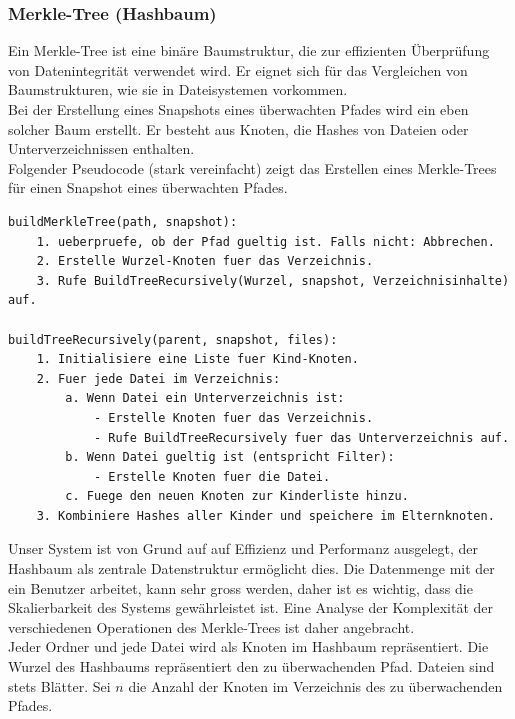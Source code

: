\documentclass[a4paper,12pt]{report}
\begin{document}
    \subsubsection{Merkle-Tree (Hashbaum)}
    Ein Merkle-Tree ist eine binäre Baumstruktur, die zur effizienten Überprüfung von Datenintegrität verwendet wird.
    Er eignet sich für das Vergleichen von Baumstrukturen, wie sie in Dateisystemen vorkommen.
    \\Bei der Erstellung eines Snapshots eines überwachten Pfades wird ein eben solcher Baum erstellt.
    Er besteht aus Knoten, die Hashes von Dateien oder Unterverzeichnissen enthalten.
    \\Folgender Pseudocode (stark vereinfacht) zeigt das Erstellen eines Merkle-Trees für einen Snapshot eines überwachten Pfades.

\begin{lstlisting}[language=Pseudo,label={lst:merkle-pseudo}]
buildMerkleTree(path, snapshot):
    1. ueberpruefe, ob der Pfad gueltig ist. Falls nicht: Abbrechen.
    2. Erstelle Wurzel-Knoten fuer das Verzeichnis.
    3. Rufe BuildTreeRecursively(Wurzel, snapshot, Verzeichnisinhalte) auf.

buildTreeRecursively(parent, snapshot, files):
    1. Initialisiere eine Liste fuer Kind-Knoten.
    2. Fuer jede Datei im Verzeichnis:
        a. Wenn Datei ein Unterverzeichnis ist:
            - Erstelle Knoten fuer das Verzeichnis.
            - Rufe BuildTreeRecursively fuer das Unterverzeichnis auf.
        b. Wenn Datei gueltig ist (entspricht Filter):
            - Erstelle Knoten fuer die Datei.
        c. Fuege den neuen Knoten zur Kinderliste hinzu.
    3. Kombiniere Hashes aller Kinder und speichere im Elternknoten.

\end{lstlisting}


    Unser System ist von Grund auf auf Effizienz und Performanz ausgelegt, der Hashbaum als zentrale Datenstruktur ermöglicht dies.
    Die Datenmenge mit der ein Benutzer arbeitet, kann sehr gross werden, daher ist es wichtig, dass die Skalierbarkeit des Systems gewährleistet ist.
    Eine Analyse der Komplexität der verschiedenen Operationen des Merkle-Trees ist daher angebracht.
    \\
    Jeder Ordner und jede Datei wird als Knoten im Hashbaum repräsentiert.
    Die Wurzel des Hashbaums repräsentiert den zu überwachenden Pfad.
    Dateien sind stets Blätter.\newline
    Sei $n$ die Anzahl der Knoten im Verzeichnis des zu überwachenden Pfades.
\end{document}
